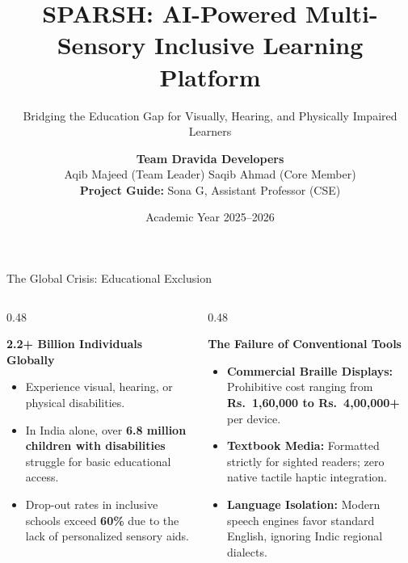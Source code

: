 \documentclass[aspectratio=169,10pt]{beamer}
\title[SPARSH Pitch Deck]{\textbf{SPARSH: AI-Powered Multi-Sensory Inclusive Learning Platform}}
\subtitle{Bridging the Education Gap for Visually, Hearing, and Physically Impaired Learners}
\author[Dravida Developers]{\textbf{Team Dravida Developers}\\Aqib Majeed (Team Leader) \quad Saqib Ahmad (Core Member)\\[0.15cm]\small \textbf{Project Guide:} Sona G, Assistant Professor (CSE)}
\institute[GCE Tirunelveli]{Government College of Engineering, Tirunelveli -- 627 007\\[0.1cm]\textbf{NMNT Project ID: NMNTSTD950061}}
\date{Academic Year 2025--2026}
\begin{document}
\begin{frame}
    \titlepage
\end{frame}

\begin{frame}{The Global Crisis: Educational Exclusion}
    \begin{columns}[T]
        \begin{column}{0.48\textwidth}
            \begin{block}{\textbf{2.2+ Billion Individuals Globally}}
                \begin{itemize}
                    \item Experience visual, hearing, or physical disabilities.
                    \item In India alone, over \textbf{6.8 million children with disabilities} struggle for basic educational access.
                    \item Drop-out rates in inclusive schools exceed \textbf{60\%} due to the lack of personalized sensory aids.
                \end{itemize}
            \end{block}
        \end{column}
        \begin{column}{0.48\textwidth}
            \begin{block}{\textbf{The Failure of Conventional Tools}}
                \begin{itemize}
                    \item \textbf{Commercial Braille Displays:} Prohibitive cost ranging from \textbf{Rs.~1,60,000 to Rs.~4,00,000+} per device.
                    \item \textbf{Textbook Media:} Formatted strictly for sighted readers; zero native tactile haptic integration.
                    \item \textbf{Language Isolation:} Modern speech engines favor standard English, ignoring Indic regional dialects.
                \end{itemize}
            \end{block}
        \end{column}
    \end{columns}
\end{frame}
\end{document}
